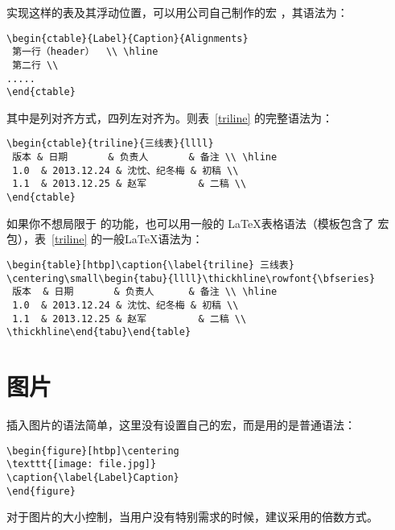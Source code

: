 实现这样的表及其浮动位置，可以用公司自己制作的宏 ，其语法为：
\begin{lstlisting}[language={[LaTeX]TeX},caption={ctable 语法}]
\begin{ctable}{Label}{Caption}{Alignments}
 第一行（header）  \\ \hline 
 第二行 \\
.....
\end{ctable}\end{lstlisting}

其中是列对齐方式，四列左对齐为。则表~\ref{triline} 的完整语法为：
\begin{lstlisting}[language={[LaTeX]TeX},caption={ctable 示例}]
\begin{ctable}{triline}{三线表}{llll}
 版本 & 日期       & 负责人       & 备注 \\ \hline 
 1.0  & 2013.12.24 & 沈忱、纪冬梅 & 初稿 \\
 1.1  & 2013.12.25 & 赵军         & 二稿 \\
\end{ctable}
\end{lstlisting}

如果你不想局限于  的功能，也可以用一般的 \LaTeX 表格语法（模板包含了  宏包），表~\ref{triline} 的一般\LaTeX 语法为：
\begin{lstlisting}[language={[LaTeX]TeX},caption={三线表的一般\LaTeX 语法示例}]
\begin{table}[htbp]\caption{\label{triline} 三线表}
\centering\small\begin{tabu}{llll}\thickhline\rowfont{\bfseries}
 版本  & 日期       & 负责人      & 备注 \\ \hline
 1.0  & 2013.12.24 & 沈忱、纪冬梅 & 初稿 \\
 1.1  & 2013.12.25 & 赵军         & 二稿 \\
\thickhline\end{tabu}\end{table}
\end{lstlisting}

\section{图片}
插入图片的语法简单，这里没有设置自己的宏，而是用的是普通语法：
\begin{lstlisting}[language={[LaTeX]TeX},caption={插入图片语法示例}]
\begin{figure}[htbp]\centering
\texttt{[image: file.jpg]} 
\caption{\label{Label}Caption}
\end{figure}\end{lstlisting}
对于图片的大小控制，当用户没有特别需求的时候，建议采用的倍数方式。

